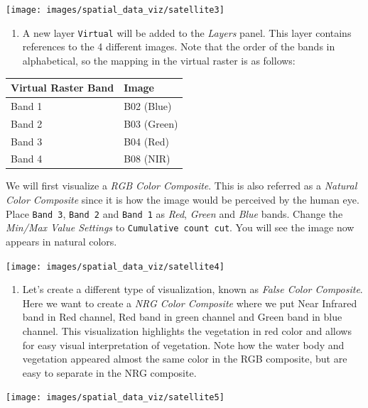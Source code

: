 \documentclass[
  12pt,
  a4paper]{article}
\providecommand{\tightlist}{%
  \setlength{\itemsep}{0pt}\setlength{\parskip}{0pt}}
\begin{document}
\begin{center}\texttt{[image: images/spatial\_data\_viz/satellite3]} \end{center}

\begin{enumerate}
\def\labelenumi{\arabic{enumi}.}
\setcounter{enumi}{3}
\tightlist
\item
  A new layer \texttt{Virtual} will be added to the \emph{Layers} panel.
  This layer contains references to the 4 different images. Note that
  the order of the bands in alphabetical, so the mapping in the virtual
  raster is as follows:
\end{enumerate}

\begin{longtable}[]{@{}ll@{}}
\toprule
\textbf{Virtual Raster Band} & \textbf{Image}\tabularnewline
\midrule
\endhead
Band 1 & B02 (Blue)\tabularnewline
Band 2 & B03 (Green)\tabularnewline
Band 3 & B04 (Red)\tabularnewline
Band 4 & B08 (NIR)\tabularnewline
\bottomrule
\end{longtable}

We will first visualize a \emph{RGB Color Composite}. This is also
referred as a \emph{Natural Color Composite} since it is how the image
would be perceived by the human eye. Place \texttt{Band\ 3},
\texttt{Band\ 2} and \texttt{Band\ 1} as \emph{Red}, \emph{Green} and
\emph{Blue} bands. Change the \emph{Min/Max Value Settings} to
\texttt{Cumulative\ count\ cut}. You will see the image now appears in
natural colors.

\begin{center}\texttt{[image: images/spatial\_data\_viz/satellite4]} \end{center}

\begin{enumerate}
\def\labelenumi{\arabic{enumi}.}
\setcounter{enumi}{4}
\tightlist
\item
  Let's create a different type of visualization, known as \emph{False
  Color Composite}. Here we want to create a \emph{NRG Color Composite}
  where we put Near Infrared band in Red channel, Red band in green
  channel and Green band in blue channel. This visualization highlights
  the vegetation in red color and allows for easy visual interpretation
  of vegetation. Note how the water body and vegetation appeared almost
  the same color in the RGB composite, but are easy to separate in the
  NRG composite.
\end{enumerate}

\begin{center}\texttt{[image: images/spatial\_data\_viz/satellite5]} \end{center}
\end{document}

